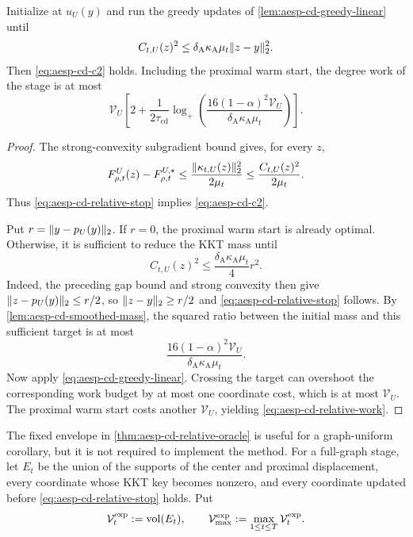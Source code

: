 \begin{theorem}
\label{thm:aesp-cd-relative-oracle}
Initialize at $u_U(y)$ and run the greedy updates of
\cref{lem:aesp-cd-greedy-linear} until
\begin{equation}
 C_{t,U}(z)^2
 \leq\delta_{\mathrm A}\kappa_{\mathrm A}\mu_t
       \lVert z-y\rVert_2^2.
 \label{eq:aesp-cd-relative-stop}
\end{equation}
Then \cref{eq:aesp-cd-c2} holds.  Including the proximal warm start, the
degree work of the stage is at most
\begin{equation}
 \mathcal V_U\left[
 2+\frac{1}{2\tau_{\mathrm{cd}}}
 \log_+\left(
  \frac{16(1-\alpha)^2\mathcal V_U}
       {\delta_{\mathrm A}\kappa_{\mathrm A}\mu_t}
 \right)\right].
 \label{eq:aesp-cd-relative-work}
\end{equation}
\end{theorem}

\begin{proof}
The strong-convexity subgradient bound gives, for every $z$,
\begin{equation*}
 F_{\rho,t}^U(z)-F_{\rho,t}^{U,\star}
 \leq\frac{\lVert\kappa_{t,U}(z)\rVert_2^2}{2\mu_t}
 \leq\frac{C_{t,U}(z)^2}{2\mu_t}.
\end{equation*}
Thus \cref{eq:aesp-cd-relative-stop} implies
\cref{eq:aesp-cd-c2}.

Put $r=\lVert y-p_U(y)\rVert_2$.  If $r=0$, the proximal warm start is already
optimal.  Otherwise, it is sufficient to reduce the KKT mass until
\begin{equation*}
 C_{t,U}(z)^2
 \leq\frac{\delta_{\mathrm A}\kappa_{\mathrm A}\mu_t}{4}r^2.
\end{equation*}
Indeed, the preceding gap bound and strong convexity then give
$\lVert z-p_U(y)\rVert_2\leq r/2$, so
$\lVert z-y\rVert_2\geq r/2$ and \cref{eq:aesp-cd-relative-stop} follows.
By \cref{lem:aesp-cd-smoothed-mass}, the squared ratio between the initial
mass and this sufficient target is at most
\begin{equation*}
 \frac{16(1-\alpha)^2\mathcal V_U}
      {\delta_{\mathrm A}\kappa_{\mathrm A}\mu_t}.
\end{equation*}
Now apply \cref{eq:aesp-cd-greedy-linear}.  Crossing the target can overshoot
the corresponding work budget by at most one coordinate cost, which is at
most $\mathcal V_U$.  The proximal warm start costs another
$\mathcal V_U$, yielding \cref{eq:aesp-cd-relative-work}.
\end{proof}

The fixed envelope in \cref{thm:aesp-cd-relative-oracle} is useful for a
graph-uniform corollary, but it is not required to implement the method.  For
a full-graph stage, let $E_t$ be the union of the supports of the center and
proximal displacement, every coordinate whose KKT
key becomes nonzero, and every coordinate updated before
\cref{eq:aesp-cd-relative-stop} holds.  Put
\begin{equation*}
 \mathcal V_t^{\mathrm{exp}}:=\operatorname{vol}(E_t),
 \qquad
 \mathcal V_{\max}^{\mathrm{exp}}
 :=\max_{1\leq t\leq T}\mathcal V_t^{\mathrm{exp}}.
\end{equation*}

